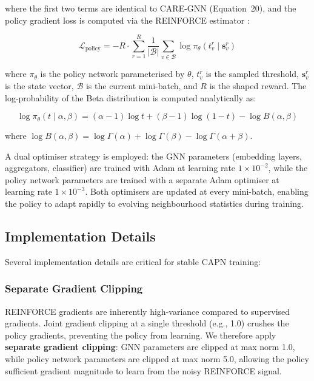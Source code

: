 \noindent
where the first two terms are identical to CARE-GNN (Equation~20), and the policy gradient loss is computed via the REINFORCE estimator \cite{williams1992simple}:

\begin{equation}
\mathcal{L}_{\text{policy}} = -R \cdot \sum_{r=1}^{R} \frac{1}{|\mathcal{B}|} \sum_{v \in \mathcal{B}} \log \pi_\theta(t_v^r \mid \mathbf{s}_v^r)
\end{equation}

\noindent
where \( \pi_\theta \) is the policy network parameterised by \( \theta \), \( t_v^r \) is the sampled threshold, \( \mathbf{s}_v^r \) is the state vector, \( \mathcal{B} \) is the current mini-batch, and \( R \) is the shaped reward. The log-probability of the Beta distribution is computed analytically as:

\begin{equation}
\log \pi_\theta(t \mid \alpha, \beta) = (\alpha - 1) \log t + (\beta - 1) \log(1 - t) - \log B(\alpha, \beta)
\end{equation}

\noindent
where \( \log B(\alpha, \beta) = \log \Gamma(\alpha) + \log \Gamma(\beta) - \log \Gamma(\alpha + \beta) \).

A dual optimiser strategy is employed: the GNN parameters (embedding layers, aggregators, classifier) are trained with Adam at learning rate \( 1 \times 10^{-2} \), while the policy network parameters are trained with a separate Adam optimiser at learning rate \( 1 \times 10^{-3} \). Both optimisers are updated at every mini-batch, enabling the policy to adapt rapidly to evolving neighbourhood statistics during training.

\subsection{Implementation Details}

Several implementation details are critical for stable CAPN training:

\subsubsection{Separate Gradient Clipping}
REINFORCE gradients are inherently high-variance compared to supervised gradients. Joint gradient clipping at a single threshold (e.g., 1.0) crushes the policy gradients, preventing the policy from learning. We therefore apply \textbf{separate gradient clipping}: GNN parameters are clipped at max norm 1.0, while policy network parameters are clipped at max norm 5.0, allowing the policy sufficient gradient magnitude to learn from the noisy REINFORCE signal.

